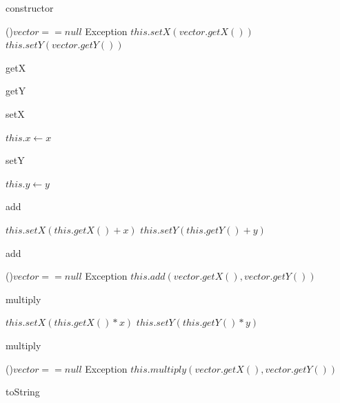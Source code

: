 \documentclass[a4paper,12pt]{article} %
\begin{document}
\begin{algorithm}
    \caption{constructor}\label{Vector2D:constructor3}
    \If(){$vector == null$}{
        Exception
    }
    $this.setX(vector.getX())$\;
    $this.setY(vector.getY())$\;
\end{algorithm}

\begin{algorithm}
    \caption{getX}\label{Vector2D:getX}
\end{algorithm}

\begin{algorithm}
    \caption{getY}\label{Vector2D:getY}
\end{algorithm}

\begin{algorithm}
    \caption{setX}\label{Vector2D:setX}
    $this.x \gets x$
\end{algorithm}

\begin{algorithm}
    \caption{setY}\label{Vector2D:setY}
    $this.y \gets y$
\end{algorithm}

\begin{algorithm}
    \caption{add}\label{Vector2D:add1}
    $this.setX(this.getX() + x)$\;
    $this.setY(this.getY() + y)$\;
\end{algorithm}

\begin{algorithm}
    \caption{add}\label{Vector2D:add2}
    \If(){$vector == null$}{
        Exception
    }
    $this.add(vector.getX(), vector.getY())$\;
\end{algorithm}

\begin{algorithm}
    \caption{multiply}\label{Vector2D:multiply1}
    $this.setX(this.getX() * x)$\;
    $this.setY(this.getY() * y)$\;
\end{algorithm}

\begin{algorithm}
    \caption{multiply}\label{Vector2D:multiply2}
    \If(){$vector == null$}{
        Exception
    }
    $this.multiply(vector.getX(), vector.getY())$\;
\end{algorithm}

\begin{algorithm}
    \caption{toString}\label{Vector2D:toString}
    \;
\end{algorithm}
\end{document}
